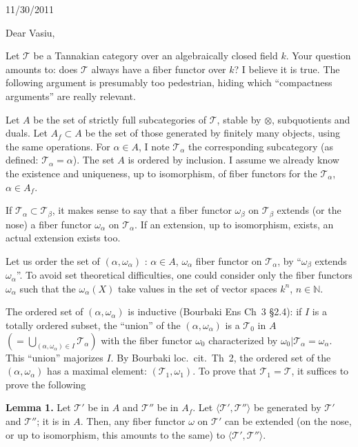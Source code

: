 \documentclass[11pt,a4paper]{article}
\theoremstyle{plain}
\theoremstyle{definition}
\begin{document}
\begin{flushright}
11/30/2011
\end{flushright}

\medskip

Dear Vasiu,

\medskip

Let $\mathcal{T}$ be a Tannakian category over an algebraically closed field $k$.
Your question amounts to: does $\mathcal{T}$ always have a fiber functor over $k$?
I believe it is true. The following argument is presumably too pedestrian,
hiding which ``compactness arguments'' are really relevant.

Let $A$ be the set of strictly full subcategories of $\mathcal{T}$, stable by
$\otimes$, subquotients and duals. Let $A_f \subset A$ be the set of those
generated by finitely many objects, using the same operations. For $\alpha \in A$,
I note $\mathcal{T}_\alpha$ the corresponding subcategory (as defined:
$\mathcal{T}_\alpha = \alpha$). The set $A$ is ordered by inclusion. I assume
we already know the existence and uniqueness, up to isomorphism, of fiber
functors for the $\mathcal{T}_\alpha$, $\alpha \in A_f$.

If $\mathcal{T}_\alpha \subset \mathcal{T}_\beta$, it makes sense to say that
a fiber functor $\omega_\beta$ on $\mathcal{T}_\beta$ extends (or the nose) a
fiber functor $\omega_\alpha$ on $\mathcal{T}_\alpha$. If an extension, up to
isomorphism, exists, an actual extension exists too.

Let us order the set of $(\alpha, \omega_\alpha)$ : $\alpha \in A$,
$\omega_\alpha$ fiber functor on $\mathcal{T}_\alpha$, by ``$\omega_\beta$
extends $\omega_\alpha$''. To avoid set theoretical difficulties, one could
consider only the fiber functors $\omega_\alpha$ such that the
$\omega_\alpha(X)$ take values in the set of vector spaces $k^n$, $n \in \mathbb{N}$.

The ordered set of $(\alpha, \omega_\alpha)$ is inductive (Bourbaki Ens Ch~3
\S2.4): if $I$ is a totally ordered subset, the ``union'' of the
$(\alpha, \omega_\alpha)$ is a $\mathcal{T}_0$ in $A$
$(= \bigcup_{(\alpha,\omega_\alpha) \in I} \mathcal{T}_\alpha)$ with the fiber
functor $\omega_0$ characterized by $\omega_0|\mathcal{T}_\alpha = \omega_\alpha$.
This ``union'' majorizes $I$. By Bourbaki loc.~cit.~Th~2, the ordered set of the
$(\alpha, \omega_\alpha)$ has a maximal element: $(\mathcal{T}_1, \omega_1)$.
To prove that $\mathcal{T}_1 = \mathcal{T}$, it suffices to prove the following

\medskip
\noindent\textbf{Lemma 1.} Let $\mathcal{T}'$ be in $A$ and $\mathcal{T}''$ be in
$A_f$. Let $\langle \mathcal{T}', \mathcal{T}'' \rangle$ be generated by
$\mathcal{T}'$ and $\mathcal{T}''$; it is in $A$. Then, any fiber functor
$\omega$ on $\mathcal{T}'$ can be extended (on the nose, or up to isomorphism,
this amounts to the same) to $\langle \mathcal{T}', \mathcal{T}'' \rangle$.
\end{document}
